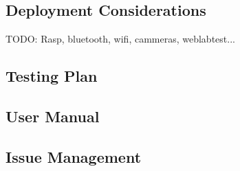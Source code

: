 \subsection{Deployment Considerations}

TODO: Rasp, bluetooth, wifi, cammeras, weblabtest...

\subsection{Testing Plan}

\subsection{User Manual}

\subsection{Issue Management}
